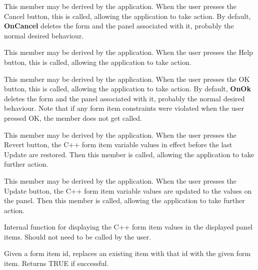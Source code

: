
This member may be derived by the application. When the user presses the
Cancel button, this is called, allowing the application to take action.
By default, {\bf OnCancel} deletes the form and the panel associated with
it, probably the normal desired behaviour.



This member may be derived by the application. When the user presses the
Help button, this is called, allowing the application to take action.



This member may be derived by the application. When the user presses the
OK button, this is called, allowing the application to take action.
By default, {\bf OnOk} deletes the form and the panel associated with
it, probably the normal desired behaviour. Note that if any form item
constraints were violated when the user pressed OK, the member does not
get called.



This member may be derived by the application. When the user presses the
Revert button, the C++ form item variable values in effect before the
last Update are restored.  Then this member is called, allowing the
application to take further action.



This member may be derived by the application. When the user presses the
Update button, the C++ form item variable values are updated to the
values on the panel.  Then this member is called, allowing the
application to take further action.



Internal function for displaying the C++ form item values in the
displayed panel items. Should not need to be called by the user.



Given a form item id, replaces an existing item with that id with the
given form item. Returns TRUE if successful.

